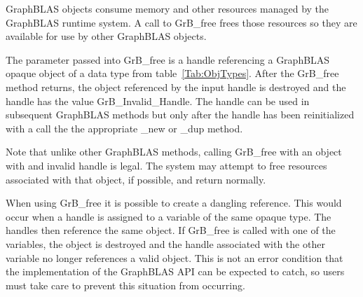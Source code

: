 GraphBLAS objects consume memory and other resources
managed by the GraphBLAS runtime system. A call to {\sf GrB\_free}
frees those resources so they are available for use by other GraphBLAS objects.

The parameter passed into {\sf GrB\_free} is a handle referencing a GraphBLAS 
opaque object of a data type from table~\ref{Tab:ObjTypes}.    After the {\sf GrB\_free} 
method returns, the object referenced by the input handle is destroyed 
and the handle has the value {\sf GrB\_Invalid\_Handle}.
The handle can be used in subsequent GraphBLAS methods but only after the handle
has been reinitialized with a call the the appropriate {\sf \_new} or {\sf \_dup} method.

Note that unlike other GraphBLAS methods, calling {\sf GrB\_free} with an object with 
and invalid handle is legal.  The system may attempt to free resources associated
with that object, if possible, and return normally.

When using {\sf GrB\_free} it is possible to create a dangling reference.  This would occur
when a handle is assigned to a variable of the same opaque type.  The handles then reference
the same object. If {\sf GrB\_free} is called with one of the variables, the object is destroyed
and the handle associated with the other variable no longer references a valid object.  This is not
an error condition that the implementation of the GraphBLAS API can be expected to catch, so
users must take care to prevent this situation from occurring.  


